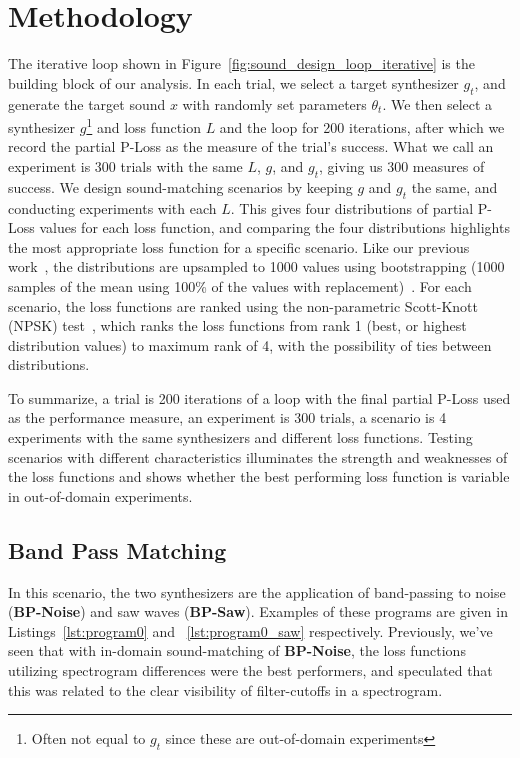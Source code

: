 \documentclass{article} %
\providecommand{\gls}[1]{#1}
\newcommand{\BPNoise}{\textbf{BP-Noise}\xspace}
\newcommand{\BPSaw}{\textbf{BP-Saw}\xspace}
\begin{document}
\section{Methodology}
\label{sec:experiment_setup}
The iterative loop shown in Figure~\ref{fig:sound_design_loop_iterative} is the building block of our analysis. In each trial, we select a target synthesizer $g_t$, and generate the target sound $x$ with randomly set parameters $\theta_t$. We then select a synthesizer $g$\footnote{Often not equal to $g_t$ since these are out-of-domain experiments} and loss function $L$ and the loop for 200 iterations, after which we record the partial P-Loss as the measure of the trial's success. What we call an experiment is 300 trials with the same $L$, $g$, and $g_t$, giving us 300 measures of success. We design sound-matching scenarios by keeping $g$ and $g_t$ the same, and conducting experiments with each $L$. This gives four distributions of partial P-Loss values for each loss function, and comparing the four distributions highlights the most appropriate loss function for a specific scenario. Like our previous work~\cite{salimi2025soundmatching}, the distributions are upsampled to 1000 values using bootstrapping (1000 samples of the mean using 100\% of the values with replacement)~\cite{tibshirani1993introduction,chernick2011bootstrap}. For each scenario, the loss functions are ranked using the non-parametric Scott-Knott (\gls{NPSK}) test~\cite{tantithamthavorn2017mvt,tantithamthavorn2018optimization}, which ranks the loss functions from rank 1 (best, or highest distribution values) to maximum rank of 4, with the possibility of ties between distributions. 

To summarize, a trial is 200 iterations of a loop with the final partial P-Loss used as the performance measure, an experiment is 300 trials, a scenario is 4 experiments with the same synthesizers and different loss functions. Testing scenarios with different characteristics illuminates the strength and weaknesses of the loss functions and shows whether the best performing loss function is variable in out-of-domain experiments.


\subsection{Band Pass Matching}
In this scenario, the two synthesizers are the application of band-passing to noise (\BPNoise) and saw waves (\BPSaw). Examples of these programs are given in Listings~\ref{lst:program0} and ~\ref{lst:program0_saw} respectively. Previously, we've seen that with in-domain sound-matching of \BPNoise, the loss functions utilizing spectrogram differences were the best performers, and speculated that this was related to the clear visibility of filter-cutoffs in a spectrogram. 
 
\end{document}
